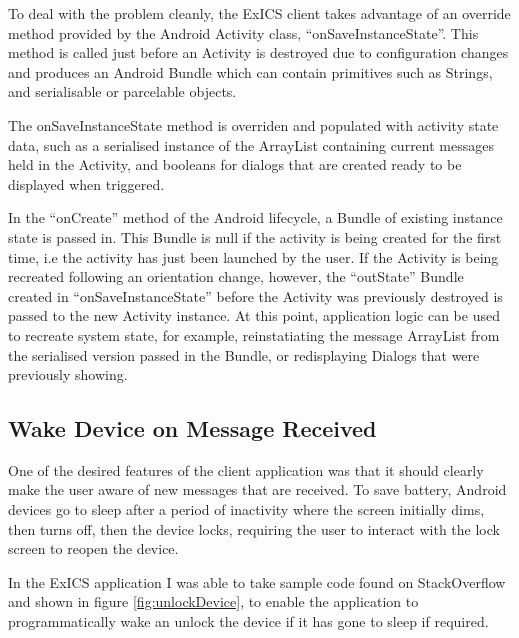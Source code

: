 To deal with the problem cleanly, the ExICS client takes advantage of an override method provided by the Android Activity class, ``onSaveInstanceState''.  This method is called just before an Activity is destroyed due to configuration changes and produces an Android Bundle which can contain primitives such as Strings, and serialisable or parcelable objects.

The onSaveInstanceState method is overriden and populated with activity state data, such as a serialised instance of the ArrayList containing current messages held in the Activity, and booleans for dialogs that are created ready to be displayed when triggered.

In the ``onCreate'' method of the Android lifecycle, a Bundle of existing instance state is passed in.  This Bundle is null if the activity is being created for the first time, i.e the activity has just been launched by the user.  If the Activity is being recreated following an orientation change, however, the ``outState'' Bundle created in ``onSaveInstanceState'' before the Activity was previously destroyed is passed to the new Activity instance.  At this point, application logic can be used to recreate system state, for example, reinstatiating the message ArrayList from the serialised version passed in the Bundle, or redisplaying Dialogs that were previously showing.

\subsection{Wake Device on Message Received}

One of the desired features of the client application was that it should clearly make the user aware of new messages that are received.  To save battery, Android devices go to sleep after a period of inactivity where the screen initially dims, then turns off, then the device locks, requiring the user to interact with the lock screen to reopen the device.

In the ExICS application I was able to take sample code found on StackOverflow\cite{awake_and_unlock} and shown in figure \ref{fig:unlockDevice}, to enable the application to programmatically wake an unlock the device if it has gone to sleep if required.

